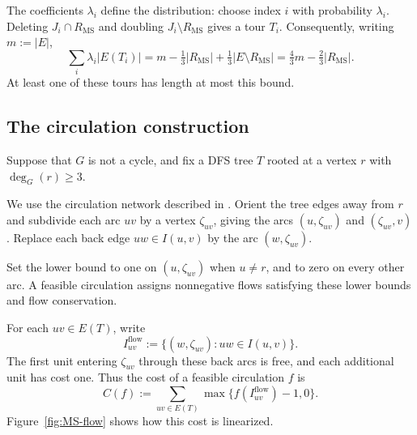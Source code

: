\documentclass[11pt]{amsart}
\newcommand{\1}{\mathbbm{1}}
\begin{document}
The coefficients $\lambda_i$ define the distribution: choose index
$i$ with probability $\lambda_i$.
Deleting $J_i\cap R_{\mathrm{MS}}$ and doubling
$J_i\setminus R_{\mathrm{MS}}$ gives a tour $T_i$.
Consequently, writing $m:=|E|$,
\begin{equation}
\label{eq:MS-one-third-bound}
 \sum_i\lambda_i|E(T_i)|
 =m-\tfrac13|R_{\mathrm{MS}}|
     +\tfrac13|E\setminus R_{\mathrm{MS}}|
 =\tfrac43m-\tfrac23|R_{\mathrm{MS}}|.
\end{equation}
At least one of these tours has length at most this bound.

\subsection{The circulation construction}
\label{subsec:MS-full-stars}

Suppose that $G$ is not a cycle, and fix a DFS tree $T$
rooted at a vertex $r$ with $\deg_G(r)\ge3$.

We use the circulation network described in
\cite[Section~12.4]{TraubVygen}. Orient the tree edges away
from $r$ and subdivide each arc $uv$ by a vertex $\zeta_{uv}$,
giving the arcs $(u,\zeta_{uv})$ and $(\zeta_{uv},v)$.
Replace each back edge $uw\in I(u,v)$ by the arc
$(w,\zeta_{uv})$.

Set the lower bound to one on $(u,\zeta_{uv})$ when
$u\ne r$, and to zero on every other arc.
A feasible circulation assigns nonnegative flows satisfying
these lower bounds and flow conservation.

For each $uv\in E(T)$, write
\[
 I^{\mathrm{flow}}_{uv}
 :=\{(w,\zeta_{uv}):uw\in I(u,v)\}.
\]
The first unit entering $\zeta_{uv}$ through these back arcs
is free, and each additional unit has cost one. Thus the
cost of a feasible circulation $f$ is
\begin{equation}
\label{eq:MS-circulation-cost}
 C(f):=\sum_{uv\in E(T)}
       \max\{f(I^{\mathrm{flow}}_{uv})-1,0\}.
\end{equation}
Figure~\ref{fig:MS-flow} shows how this cost is linearized.
\end{document}
